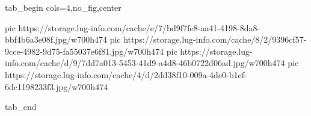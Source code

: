 
 
 
 
 

\ifcmt
	tab_begin cols=4,no_fig,center

		 pic https://storage.lug-info.com/cache/e/7/bd9f7fe8-aa41-4198-8da8-bbf4b6a3e08f.jpg/w700h474%
		 pic https://storage.lug-info.com/cache/8/2/9396cf57-9cce-4982-9d75-fa55037e6f81.jpg/w700h474%
		 pic https://storage.lug-info.com/cache/d/9/7dd7a013-5453-41d9-a4d8-46b0722d06ad.jpg/w700h474%
		 pic https://storage.lug-info.com/cache/4/d/2dd38f10-009a-4de0-b1ef-6dc1198233f3.jpg/w700h474%

	tab_end
\fi
